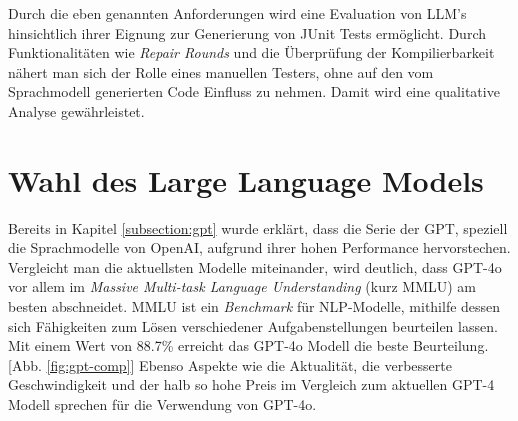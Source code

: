 Durch die eben genannten Anforderungen wird eine Evaluation von LLM's hinsichtlich ihrer Eignung zur Generierung von JUnit Tests ermöglicht. Durch Funktionalitäten wie \textit{Repair Rounds} und die Überprüfung der Kompilierbarkeit nähert man sich der Rolle eines manuellen Testers, ohne auf den vom Sprachmodell generierten Code Einfluss zu nehmen. Damit wird eine qualitative Analyse gewährleistet.

\section{Wahl des Large Language Models}
Bereits in Kapitel \ref{subsection:gpt} wurde erklärt, dass die Serie der GPT, speziell die Sprachmodelle von OpenAI, aufgrund ihrer hohen Performance hervorstechen. Vergleicht man die aktuellsten Modelle miteinander, wird deutlich, dass GPT-4o vor allem im \textit{Massive Multi-task Language Understanding} (kurz MMLU) am besten abschneidet. \acs{MMLU} ist ein \textit{Benchmark} für NLP-Modelle, mithilfe dessen sich Fähigkeiten zum Lösen verschiedener Aufgabenstellungen beurteilen lassen. Mit einem Wert von 88.7\% erreicht das GPT-4o Modell die beste Beurteilung. [Abb. \ref{fig:gpt-comp}] \cite{HelloGPT4o} Ebenso Aspekte wie die Aktualität, die verbesserte Geschwindigkeit und der halb so hohe Preis im Vergleich zum aktuellen GPT-4 Modell sprechen für die Verwendung von GPT-4o. \cite{HelloGPT4o} 

